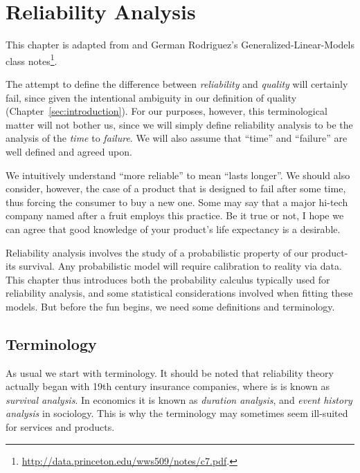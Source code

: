 \chapter{Reliability Analysis}

This chapter is adapted from \cite[Ch.8]{natrella_nist/sematech_2010} and German Rodriguez's Generalized-Linear-Models class notes\footnote{\url{http://data.princeton.edu/wws509/notes/c7.pdf}.}.

The attempt to define the difference between \emph{reliability} and \emph{quality} will certainly fail, since given the intentional ambiguity in our definition of quality (Chapter~\ref{sec:introduction}).
For our purposes, however, this terminological matter will not bother us, since we will simply define reliability analysis to be the analysis of the \emph{time} to \emph{failure}.
We will also assume that ``time'' and ``failure'' are well defined and agreed upon.

We intuitively understand ``more reliable'' to mean ``lasts longer''. 
We should also consider, however, the case of a product that is designed to fail after some time, thus forcing the consumer to buy a new one. 
Some may say that a major hi-tech company named after a fruit employs this practice. 
Be it true or not, I hope we can agree that good knowledge of your product's life expectancy is a desirable. 

Reliability analysis involves the study of a probabilistic property of our product- its survival.
Any probabilistic model will require calibration to reality via data. 
This chapter thus introduces both the probability calculus typically used for reliability analysis, and some statistical considerations involved when fitting these models.
But before the fun begins, we need some definitions and terminology.







\section{Terminology}
As usual we start with terminology.
It should be noted that reliability theory actually began with 19th century insurance companies, where is is known as \emph{survival analysis}.
In economics it is known as \emph{duration analysis}, and \emph{event history analysis} in sociology. 
This is why the terminology may sometimes seem ill-suited for services and products. 


